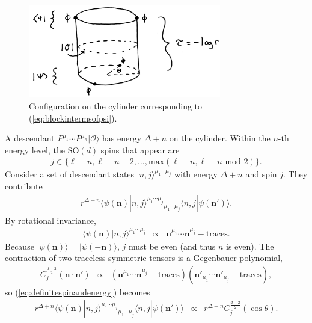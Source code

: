 \documentclass[12pt]{article}
\numberwithin{equation}{section}
\newcommand\be{\begin{eqnarray}}
\newcommand\ee{\end{eqnarray}}
\newcommand\cO{\mathcal{O}}
\newcommand\<\langle
\renewcommand\>\rangle
\renewcommand\.{\cdot}
\newcommand\SO{\mathrm{SO}}
\newcommand\De{\Delta}
\newcommand\bn{\mathbf{n}}
\renewcommand\th{\theta}
\begin{document}
\begin{figure}
\begin{center}
\includegraphics[width=0.75\textwidth]{cylinderconfig.jpg}
\end{center}
\caption{Configuration on the cylinder corresponding to (\ref{eq:blockintermsofpsi}).  \label{fig:cylinderconfig}}
\end{figure}

A descendant $P^{\mu_1}\cdots P^{\mu_n}|\cO\>$ has energy $\De+n$ on the cylinder.  Within the $n$-th energy level, the $\SO(d)$ spins that appear are
\be
\label{eq:rangeofjs}
j \in \{\ell+n,\ell+n-2,\dots,\mathrm{max}(\ell-n,\ell+n\,\,\mathrm{mod}\,\,2)\}.
\ee
Consider a set of descendant states $|n,j\>^{\mu_1\cdots\mu_j}$ with energy $\De+n$ and spin $j$. They contribute
\be
r^{\De+n} \<\psi(\bn)|n,j\>^{\mu_1\cdots\mu_j}{}_{\mu_1\cdots\mu_j}\<n,j|\psi(\bn')\>.
\label{eq:definitespinandenergy}
\ee
By rotational invariance,
\be
\<\psi(\bn)|n,j\>^{\mu_1\cdots\mu_j} &\propto& \bn^{\mu_1}\cdots\bn^{\mu_j}-\mathrm{traces}.
\ee
Because $|\psi(\bn)\>=|\psi(-\bn)\>$, $j$ must be even (and thus $n$ is even).
The contraction of two traceless symmetric tensors is a Gegenbauer polynomial,
\be
C_j^{\frac{d-2}{2}}(\bn\cdot\bn') &\propto& (\bn^{\mu_1}\cdots\bn^{\mu_j}-\mathrm{traces})(\bn'_{\mu_1}\cdots\bn'_{\mu_j}-\mathrm{traces}),
\ee
so (\ref{eq:definitespinandenergy}) becomes
\be
r^{\De+n} \<\psi(\bn)|n,j\>^{\mu_1\cdots\mu_j}{}_{\mu_1\cdots\mu_j}\<n,j|\psi(\bn')\> &\propto& r^{\De+n}C_j^{\frac{d-2}{2}}(\cos\th).
\ee
\end{document}
